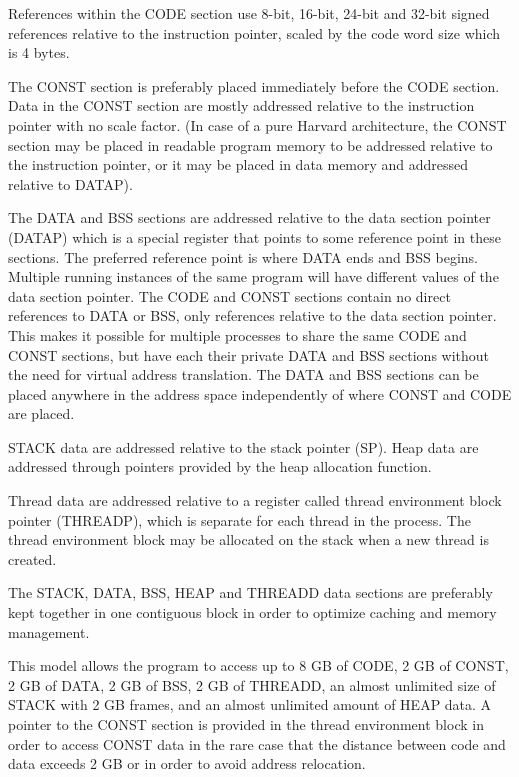 \documentclass[forwardcom.tex]{subfiles}
\begin{document}
References within the CODE section use 8-bit, 16-bit, 24-bit and 32-bit signed references relative to the instruction pointer, scaled by the code word size which is 4 bytes. 
\vspace{2mm}

The CONST section is preferably placed immediately before the CODE section. Data in the CONST section are mostly addressed relative to the instruction pointer with no scale factor. (In case of a pure Harvard architecture, the CONST section may be placed in readable program 
memory to be addressed relative to the instruction pointer, or it may be placed in data memory and addressed relative to DATAP). 
\vspace{2mm}

The DATA and BSS sections are addressed relative to the data section pointer (DATAP) which is a special register that points to some reference point in these sections. The preferred reference point is where DATA ends and BSS begins. Multiple running instances of the same program will have different values of the data section pointer. The CODE and CONST sections contain no direct references to DATA or BSS, only references relative to the data section pointer. This makes it possible for multiple processes to share the same CODE and CONST sections, but have each their private DATA and BSS sections without the need for virtual address translation. The DATA and BSS sections can be placed anywhere in the address space independently of where CONST and CODE are placed.
\vspace{2mm}

STACK data are addressed relative to the stack pointer (SP). Heap data are addressed through pointers provided by the heap allocation function. 
\vspace{2mm}

Thread data are addressed relative to a register called thread environment block pointer (THREADP), which is separate for each thread in the process. The thread environment block may be allocated on the stack when a new thread is created. 
\vspace{2mm}

The STACK, DATA, BSS, HEAP and THREADD data sections are preferably kept together in one contiguous block in order to optimize caching and memory management. 
\vspace{2mm}

This model allows the program to access up to 8 GB of CODE, 2 GB of CONST, 2 GB of DATA, 2 GB of BSS, 2 GB of THREADD, an almost unlimited size of STACK with 2 GB frames, and an almost unlimited amount of HEAP data. A pointer to the CONST section is provided in the thread environment block in order to access CONST data in the rare case that the distance between code and data exceeds 2 GB or in order to avoid address relocation. 
\vspace{2mm}
\end{document}
